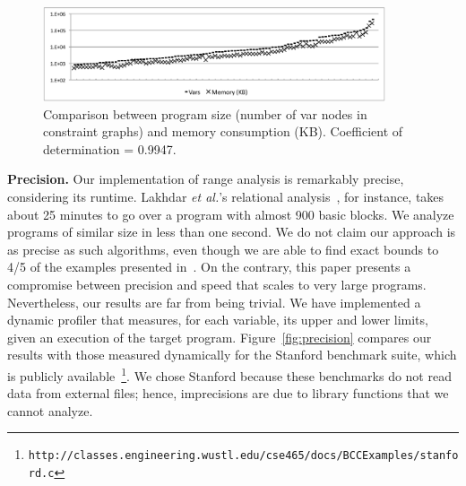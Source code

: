 \documentclass[preprint]{elsarticle}
\begin{document}
\begin{figure}[t!]
\begin{center}
\includegraphics[width=0.9\textwidth]{images/MemCorr}
\end{center}
\caption{\label{fig:MemCorr}
Comparison between program size (number of var nodes in constraint
graphs) and memory consumption (KB).
Coefficient of determination = 0.9947.
}
\end{figure}

\noindent
\textbf{Precision.}
Our implementation of range analysis is remarkably precise, considering its
runtime.
Lakhdar {\em et al.}'s relational analysis~\cite{Lakhdar11}, for instance, takes
about 25 minutes to go over a program with almost 900 basic blocks.
We analyze programs of similar size in less than one second.
We do not claim our approach is as precise as such algorithms, even though we
are able to find exact bounds to 4/5 of the examples presented
in~\cite{Lakhdar11}.
On the contrary, this paper presents a compromise between precision and speed
that scales to very large programs.
Nevertheless, our results are far from being trivial.
We have implemented a dynamic profiler that measures, for each variable,
its upper and lower limits, given an execution of the target program.
Figure~\ref{fig:precision} compares our results with those measured
dynamically for the Stanford benchmark suite, which is publicly
available~\footnote{\texttt{http://classes.engineering.wustl.edu/cse465/docs/BCCExamples/stanford.c}}.
We chose Stanford because these benchmarks do not read data from external
files; hence, imprecisions are due to library functions that we cannot
analyze.
\end{document}

